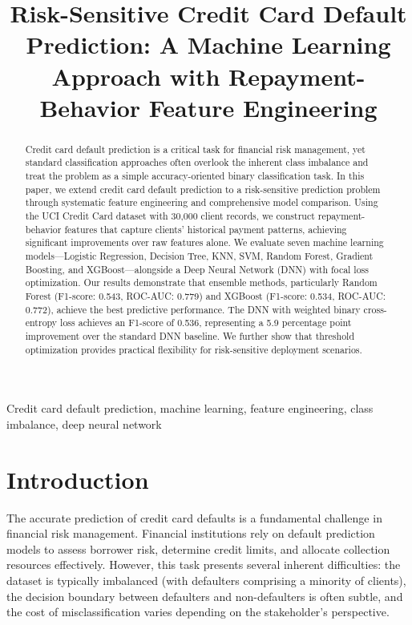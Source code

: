 \documentclass[conference]{IEEEtran}
\begin{document}
\title{Risk-Sensitive Credit Card Default Prediction: A Machine Learning Approach with Repayment-Behavior Feature Engineering}

\author{
}

\maketitle

\begin{abstract}
Credit card default prediction is a critical task for financial risk management, yet standard classification approaches often overlook the inherent class imbalance and treat the problem as a simple accuracy-oriented binary classification task. In this paper, we extend credit card default prediction to a risk-sensitive prediction problem through systematic feature engineering and comprehensive model comparison. Using the UCI Credit Card dataset with 30,000 client records, we construct repayment-behavior features that capture clients' historical payment patterns, achieving significant improvements over raw features alone. We evaluate seven machine learning models---Logistic Regression, Decision Tree, KNN, SVM, Random Forest, Gradient Boosting, and XGBoost---alongside a Deep Neural Network (DNN) with focal loss optimization. Our results demonstrate that ensemble methods, particularly Random Forest (F1-score: 0.543, ROC-AUC: 0.779) and XGBoost (F1-score: 0.534, ROC-AUC: 0.772), achieve the best predictive performance. The DNN with weighted binary cross-entropy loss achieves an F1-score of 0.536, representing a 5.9 percentage point improvement over the standard DNN baseline. We further show that threshold optimization provides practical flexibility for risk-sensitive deployment scenarios.
\end{abstract}

\begin{IEEEkeywords}
Credit card default prediction, machine learning, feature engineering, class imbalance, deep neural network
\end{IEEEkeywords}

\section{Introduction}
The accurate prediction of credit card defaults is a fundamental challenge in financial risk management. Financial institutions rely on default prediction models to assess borrower risk, determine credit limits, and allocate collection resources effectively. However, this task presents several inherent difficulties: the dataset is typically imbalanced (with defaulters comprising a minority of clients), the decision boundary between defaulters and non-defaulters is often subtle, and the cost of misclassification varies depending on the stakeholder's perspective.
\end{document}
